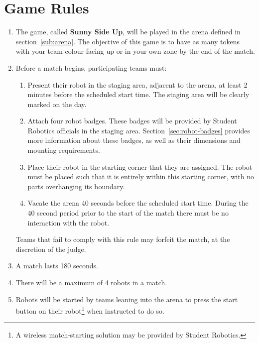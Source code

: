 \section {Game Rules}
\label{game-rules}

\begin{enumerate}
\item The game, called \textbf{Sunny Side Up}, will be played in the arena defined in section~\ref{sub:arena}.
      The objective of this game is to have as many tokens with your team colour facing up or in your own zone by the end of the match.

\item Before a match begins, participating teams must:
\begin {enumerate}
  \item Present their robot in the staging area, adjacent to the arena, at least 2 minutes before the scheduled start time.
        The staging area will be clearly marked on the day.

  \item Attach four robot badges.
        These badges will be provided by Student Robotics officials in the staging area.
        Section~\ref{sec:robot-badges} provides more information about these badges, as well as their dimensions and mounting requirements.

  \item Place their robot in the starting corner that they are assigned.
        The robot must be placed such that it is entirely within this starting corner, with no parts overhanging its boundary.

  \item Vacate the arena 40 seconds before the scheduled start time.
        During the 40 second period prior to the start of the match there must be no interaction with the robot.
\end{enumerate}
  Teams that fail to comply with this rule may forfeit the match, at the discretion of the judge.

\item A match lasts 180 seconds.

\item There will be a maximum of 4 robots in a match.

\item Robots will be started by teams leaning into the arena to press the start button on their robot\footnote{A wireless match-starting solution may be provided by Student Robotics.} when instructed to do so.


\end{enumerate}
